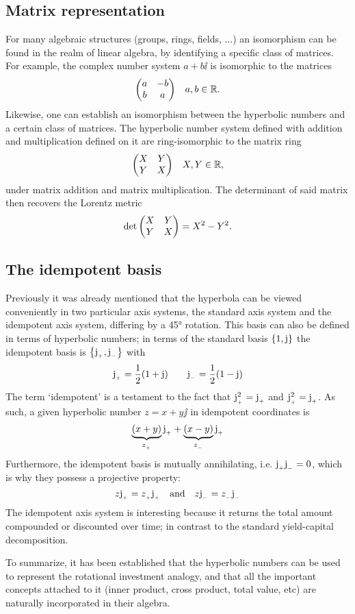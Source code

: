 \subsection{Matrix representation}
For many algebraic structures (groups, rings, fields, ...) an isomorphism can be found in the realm of linear algebra, by identifying a specific class of matrices. For example, the complex number system \(a + b\ii\) is isomorphic to the matrices
\[
     \mqty(a & -b \\ b & a) \quad a, b \in \real.
\]
Likewise, one can establish an isomorphism between the hyperbolic numbers and a certain class of matrices. The hyperbolic number system defined with addition and multiplication defined on it are ring-isomorphic to the matrix ring
\[
     \mqty(X & Y \\ Y & X) \quad X, Y \in \real,
\]
under matrix addition and matrix multiplication. The determinant of said matrix then recovers the Lorentz metric
\[
     \det \mqty(X & Y \\ Y & X) = X^2 - Y^2.
\]

\subsection{The idempotent basis}
Previously it was already mentioned that the hyperbola can be viewed conveniently in two particular axis systems, the standard axis system and the idempotent axis system, differing by a \ang{45} rotation. This basis can also be defined in terms of hyperbolic numbers; in terms of the standard basis \(\qty{1, \ensuremath{\mathrm{j}}}\) the idempotent basis is \(\qty{\ensuremath{\mathrm{j}_{_+}}, \ensuremath{\mathrm{j}_{_-}}}\) with 
\[
     \mathrm{j}_{_+} = \frac{1}{2}(1 + \mathrm{j}) \qquad \mathrm{j}_{_-} = \frac{1}{2}(1 - \mathrm{j})
\]
The term `idempotent' is a testament to the fact that \(\mathrm{j}_{_+}^2 = \mathrm{j}_{_+}\) and \(\mathrm{j}_{_+}^2 = \mathrm{j}_{_+}\). As such, a given hyperbolic number \(z = x + y\jj\) in idempotent coordinates is 
\[
     \underbrace{\qty(x + y)}_{z_{_+}}\mathrm{j}_{_+} + \underbrace{\qty(x - y)}_{z_{_-}}\mathrm{j}_{_+}
\]
Furthermore, the idempotent basis is mutually annihilating, i.e. \(\mathrm{j}_{_+} \mathrm{j}_{_-} = 0\), which is why they possess a projective property: \cite{Sobczyk1995}
\[
     z\mathrm{j}_{_+} = z_{_+}\mathrm{j}_{_+}\quad\text{and}\quad z\mathrm{j}_{_-} = z_{_-}\mathrm{j}_{_-}
\]
The idempotent axis system is interesting because it returns the total amount compounded or discounted over time; in contrast to the standard yield-capital decomposition.

To summarize, it has been established that the hyperbolic numbers can be used to represent the rotational investment analogy, and that all the important concepts attached to it (inner product, cross product, total value, etc) are naturally incorporated in their algebra.

